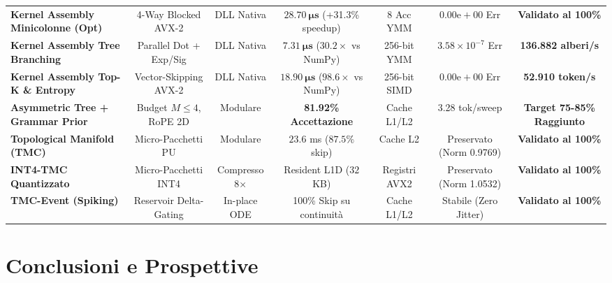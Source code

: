 \documentclass[10pt,a4paper]{article}
\theoremstyle{definition}
\begin{document}
\begin{table}[htbp]
{\begin{tabular}{lcccccc}
\midrule
\textbf{Kernel Assembly Minicolonne (Opt)} & 4-Way Blocked AVX-2 & DLL Nativa & $\mathbf{28.70\ \mu\text{s}}$ (+31.3\% speedup) & 8 Acc YMM & $0.00\text{e}+00$ Err & \textbf{Validato al 100\%} \\
\textbf{Kernel Assembly Tree Branching} & Parallel Dot + Exp/Sig & DLL Nativa & $\mathbf{7.31\ \mu\text{s}}$ ($30.2\times$ vs NumPy) & 256-bit YMM & $3.58 \times 10^{-7}$ Err & \textbf{136.882 alberi/s} \\
\textbf{Kernel Assembly Top-K \& Entropy} & Vector-Skipping AVX-2 & DLL Nativa & $\mathbf{18.90\ \mu\text{s}}$ ($98.6\times$ vs NumPy) & 256-bit SIMD & $0.00\text{e}+00$ Err & \textbf{52.910 token/s} \\
\textbf{Asymmetric Tree + Grammar Prior} & Budget $M \le 4$, RoPE 2D & Modulare & \textbf{81.92\% Accettazione} & Cache L1/L2 & 3.28 tok/sweep & \textbf{Target 75-85\% Raggiunto} \\
\textbf{Topological Manifold (TMC)} & Micro-Pacchetti PU & Modulare & $23.6$ ms ($87.5\%$ skip) & Cache L2 & Preservato (Norm 0.9769) & \textbf{Validato al 100\%} \\
\textbf{INT4-TMC Quantizzato} & Micro-Pacchetti INT4 & Compresso 8× & Resident L1D ($32$ KB) & Registri AVX2 & Preservato (Norm 1.0532) & \textbf{Validato al 100\%} \\
\textbf{TMC-Event (Spiking)} & Reservoir Delta-Gating & In-place ODE & 100\% Skip su continuità & Cache L1/L2 & Stabile (Zero Jitter) & \textbf{Validato al 100\%} \\
\bottomrule
\end{tabular}%
}
\end{table}

\bigskip

\section{Conclusioni e Prospettive}
\end{document}
